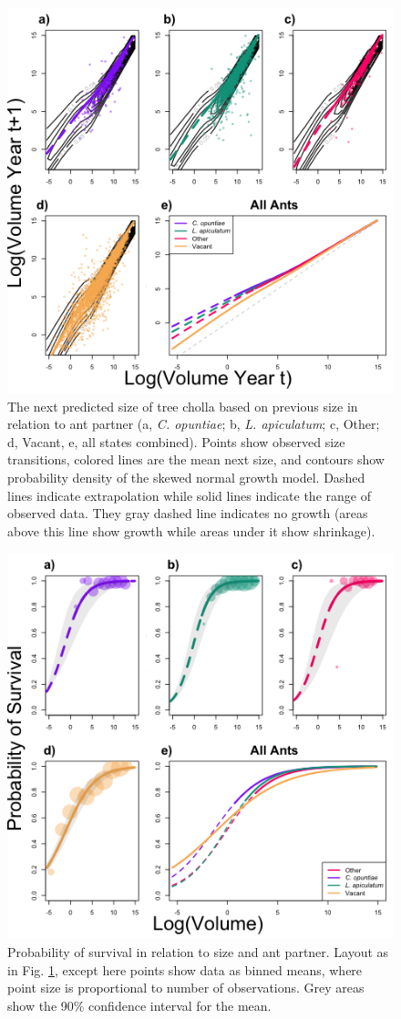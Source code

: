 \documentclass[11pt]{article}
\begin{document}
\begin{figure}[H]
	\includegraphics[width = 0.75\linewidth]{Figures/grow_contour_v2.png}
	\caption{The next predicted size of tree cholla based on previous size in relation to ant partner (a, \textit{C. opuntiae}; b, \textit{L. apiculatum}; c, Other; d, Vacant, e, all states combined). Points show observed size transitions, colored lines are the mean next size, and contours show probability density of the skewed normal growth model.  
	Dashed lines indicate extrapolation while solid lines indicate the range of observed data.
	They gray dashed line indicates no growth (areas above this line show growth while areas under it show shrinkage).}
	\label{fig:Grow}
\end{figure}

\begin{figure}[H]
\includegraphics[width=0.75\linewidth]{Figures/survival_plot.png}
\caption{Probability of survival in relation to size and ant partner. Layout as in Fig. \ref{fig:Grow}, except here points show data as binned means, where point size is proportional to number of observations. Grey areas show the 90\% confidence interval for the mean.}
\label{fig:Surv}
\end{figure}
\end{document}
